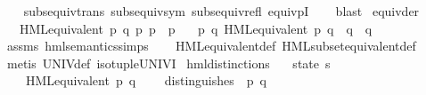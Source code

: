 \begin{isabellebody}
%
\isadelimproof
\ \ %
\endisadelimproof
%
\isatagproof
{}\isamarkupfalse%
\ subs{\isacharunderscore}{\kern0pt}equiv{\isacharunderscore}{\kern0pt}trans\ subs{\isacharunderscore}{\kern0pt}equiv{\isacharunderscore}{\kern0pt}sym\ subs{\isacharunderscore}{\kern0pt}equiv{\isacharunderscore}{\kern0pt}refl\ equivpI\isanewline
\ \ \isamarkupfalse%
\ blast%
\endisatagproof
{\isafoldproof}%
%
\isadelimproof
\isanewline
%
\endisadelimproof
%
\isadelimvisible
\isanewline
%
\endisadelimvisible
%
\isatagvisible
{}\isamarkupfalse%
\ equiv{\isacharunderscore}{\kern0pt}der{\isacharcolon}{\kern0pt}\isanewline
\ \ \ {\isachardoublequoteopen}HML{\isacharunderscore}{\kern0pt}equivalent\ p\ q{\isachardoublequoteclose}\ {\isachardoublequoteopen}{\isasymexists}p{\isacharprime}{\kern0pt}{\isachardot}{\kern0pt}\ p\ {\isasymmapsto}{\isasymalpha}\ p{\isacharprime}{\kern0pt}{\isachardoublequoteclose}\isanewline
\ \ \ {\isachardoublequoteopen}{\isasymexists}p{\isacharprime}{\kern0pt}\ q{\isacharprime}{\kern0pt}{\isachardot}{\kern0pt}\ {\isacharparenleft}{\kern0pt}HML{\isacharunderscore}{\kern0pt}equivalent\ p{\isacharprime}{\kern0pt}\ q{\isacharprime}{\kern0pt}{\isacharparenright}{\kern0pt}\ {\isasymand}\ q\ {\isasymmapsto}{\isasymalpha}\ q{\isacharprime}{\kern0pt}{\isachardoublequoteclose}\isanewline
\ \ \isamarkupfalse%
\ assms\ hml{\isacharunderscore}{\kern0pt}semantics{\isachardot}{\kern0pt}simps\isanewline
\ \ \isamarkupfalse%
\ HML{\isacharunderscore}{\kern0pt}equivalent{\isacharunderscore}{\kern0pt}def\ HML{\isacharunderscore}{\kern0pt}subset{\isacharunderscore}{\kern0pt}equivalent{\isacharunderscore}{\kern0pt}def\isanewline
\ \ \isamarkupfalse%
\ {\isacharparenleft}{\kern0pt}metis\ UNIV{\isacharunderscore}{\kern0pt}def\ iso{\isacharunderscore}{\kern0pt}tuple{\isacharunderscore}{\kern0pt}UNIV{\isacharunderscore}{\kern0pt}I{\isacharparenright}{\kern0pt}%
\endisatagvisible
{\isafoldvisible}%
%
\isadelimvisible
\isanewline
%
\endisadelimvisible
\isanewline
{}\isamarkupfalse%
\ hml{\isacharunderscore}{\kern0pt}distinctions{\isacharcolon}{\kern0pt}\isanewline
\ \ \ state{\isacharcolon}{\kern0pt}{\isacharcolon}{\kern0pt}\ {\isacharprime}{\kern0pt}s\isanewline
\ \ \ {\isacartoucheopen}{\isasymnot}\ HML{\isacharunderscore}{\kern0pt}equivalent\ p\ q{\isacartoucheclose}\isanewline
\ \ \ {\isacartoucheopen}{\isasymexists}{\isasymphi}{\isachardot}{\kern0pt}\ distinguishes\ {\isasymphi}\ p\ q{\isacartoucheclose}\isanewline

\end{isabellebody}
